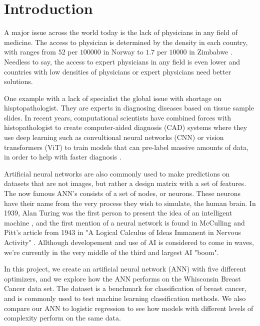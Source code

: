 \section{Introduction}\label{sec:introduction}

A major issue across the world today is the lack of physicians in any field of medicine. The access to physician is determined by the 
density in each country, with ranges from $52$ per $10 0000$ in Norway to $1.7$ per $10 000$ in Zimbabwe \cite{who_physicians}. Needless to say, 
the access to expert physicians in any field is even lower and countries with low densities of physicians or expert physicians need better
solutions. 

One example with a lack of specialist the global issue with shortage on hisptopathologist. They are experts in diagnosing 
diseases based on tissue sample slides. In recent years, computational scientists have combined forces with histopathologist to create computer-aided 
diagnosis (CAD) systems where they use deep learning such as convultional neural networks (CNN) or vision transformers (ViT)
to train models that can pre-label massive amounts of data, in order to help with faster diagnosis \cite{histopath_AI}.

Artificial neural networks are also commonly used to make predictions on datasets that are not images, but rather a design matrix with a set of features.
The now famous ANN's consists of a set of nodes, or neurons. These neurons have their name from the very process they wish to simulate, the
human brain. In 1939, Alan Turing was the first person to present the idea of an intelligent machine \cite{turing_36}, and the first mention of a 
neural network is found in McCulling and Pitt's article from 1943 in "A Logical Calculus of Ideas Immanent in Nervous Activity" \cite{mccu_pitt}. 
Allthough developement and use of AI is considered to come in waves, we're currently in the very middle of the third and largest AI "boom". 

In this project, we create an artificial neural network (ANN) with five different optimizers, and we explore how the ANN performs on the 
Whisconsin Breast Cancer data set. The dataset is a benchmark for classification of breast cancer, and is commonly used to test machine learning 
classification methods. We also compare our ANN to logistic regression to see how models with different levels of complexity perform on the same data. 

